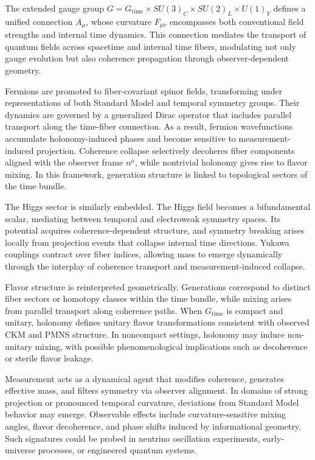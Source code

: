 \documentclass[11pt]{article}
\begin{document}
The extended gauge group \( G = G_{\mathrm{time}} \times SU(3)_C \times SU(2)_L \times U(1)_Y \) defines a unified connection \( A_\mu \), whose curvature \( F_{\mu\nu} \) encompasses both conventional field strengths and internal time dynamics. This connection mediates the transport of quantum fields across spacetime and internal time fibers, modulating not only gauge evolution but also coherence propagation through observer-dependent geometry.

Fermions are promoted to fiber-covariant spinor fields, transforming under representations of both Standard Model and temporal symmetry groups. Their dynamics are governed by a generalized Dirac operator that includes parallel transport along the time-fiber connection. As a result, fermion wavefunctions accumulate holonomy-induced phases and become sensitive to measurement-induced projection. Coherence collapse selectively decoheres fiber components aligned with the observer frame \( n^\mu \), while nontrivial holonomy gives rise to flavor mixing. In this framework, generation structure is linked to topological sectors of the time bundle.

The Higgs sector is similarly embedded. The Higgs field becomes a bifundamental scalar, mediating between temporal and electroweak symmetry spaces. Its potential acquires coherence-dependent structure, and symmetry breaking arises locally from projection events that collapse internal time directions. Yukawa couplings contract over fiber indices, allowing mass to emerge dynamically through the interplay of coherence transport and measurement-induced collapse.

Flavor structure is reinterpreted geometrically. Generations correspond to distinct fiber sectors or homotopy classes within the time bundle, while mixing arises from parallel transport along coherence paths. When \( G_{\mathrm{time}} \) is compact and unitary, holonomy defines unitary flavor transformations consistent with observed CKM and PMNS structure. In noncompact settings, holonomy may induce non-unitary mixing, with possible phenomenological implications such as decoherence or sterile flavor leakage.

Measurement acts as a dynamical agent that modifies coherence, generates effective mass, and filters symmetry via observer alignment. In domains of strong projection or pronounced temporal curvature, deviations from Standard Model behavior may emerge. Observable effects include curvature-sensitive mixing angles, flavor decoherence, and phase shifts induced by informational geometry. Such signatures could be probed in neutrino oscillation experiments, early-universe processes, or engineered quantum systems.
\end{document}
